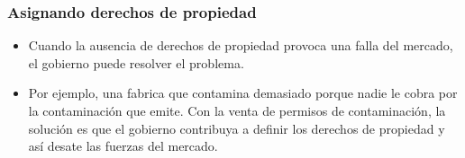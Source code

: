 \documentclass{beamer}
\begin{document}
\begin{frame}
\frametitle{Asignando derechos de propiedad}
\begin{itemize}
\item Cuando la ausencia de derechos de propiedad provoca una falla del mercado, el gobierno puede resolver el problema.
\item Por ejemplo, una fabrica que contamina demasiado porque nadie le cobra por la contaminación que emite. Con la venta de permisos de contaminación, la solución es que el gobierno contribuya a definir los derechos de propiedad y así desate las fuerzas del mercado. 
\end{itemize}
\end{frame}
\end{document}
